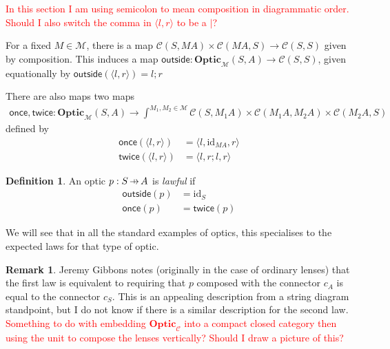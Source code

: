 \documentclass[11pt,a4paper]{article}
\theoremstyle{plain}
\theoremstyle{definition}
\newtheorem{definition}[theorem]{Definition}
\newtheorem{remark}[theorem]{Remark}
\newcommand{\C}{\mathscr{C}}
\newcommand{\M}{\mathscr{M}}
\newcommand{\Optic}{\mathbf{Optic}}
\newcommand{\id}{\mathrm{id}}
\newcommand{\outside}{\mathsf{outside}}
\newcommand{\once}{\mathsf{once}}
\newcommand{\twice}{\mathsf{twice}}
\newcommand{\hto}{\ensuremath{\,\mathaccent\shortmid\rightarrow\,}}
\newcommand{\todo}[1]{\textcolor{red}{\small #1}}
\begin{document}
\todo{In this section I am using semicolon to mean composition in diagrammatic order. Should I also switch the comma in $\langle l, r \rangle$ to be a $\mid$?}

For a fixed $M \in \M$, there is a map $\C(S, M A) \times \C(M A, S) \to \C(S, S)$ given by composition. This induces a map $\outside : \Optic_\M(S, A) \to \C(S, S)$, given equationally by $\outside(\langle l, r \rangle) = l ; r$

There are also maps two maps
\begin{align*}
  \once, \twice : \Optic_\M(S, A) \to \int^{M_1, M_2 \in \M} \C(S, M_1 A) \times \C(M_1 A, M_2 A) \times \C(M_2 A, S)
\end{align*}
defined by
\begin{align*}
  \once(\langle l, r \rangle) &= \langle l, \id_{MA}, r \rangle \\
  \twice(\langle l, r \rangle) &= \langle l, r;l, r \rangle
\end{align*}

\begin{definition}
  An optic $p : S \hto A$ is \emph{lawful} if
  \begin{align*}
    \outside(p) &= \id_S \\
    \once(p) &= \twice(p)
  \end{align*}
\end{definition}

We will see that in all the standard examples of optics, this specialises to the expected laws for that type of optic.

\begin{remark}
  Jeremy Gibbons notes (originally in the case of ordinary lenses) that the first law is equivalent to requiring that $p$ composed with the connector $c_A$ is equal to the connector $c_S$. This is an appealing description from a string diagram standpoint, but I do not know if there is a similar description for the second law. \todo{Something to do with embedding $\Optic_\C$ into a compact closed category then using the unit to compose the lenses vertically? Should I draw a picture of this?}
\end{remark}
\end{document}
